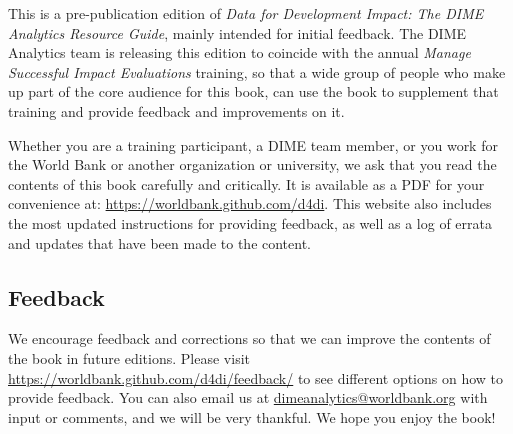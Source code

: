 This is a pre-publication edition of
\textit{Data for Development Impact:
The DIME Analytics Resource Guide}, mainly intended for initial feedback.
The DIME Analytics team is releasing this edition
to coincide with the annual \textit{Manage Successful Impact Evaluations} training,
so that a wide group of people who make up
part of the core audience for this book,
can use the book to supplement that training
and provide feedback and improvements on it.

Whether you are a training participant,
a DIME team member, or you work for the World Bank
or another organization or university,
we ask that you read the contents of this book carefully and critically.
It is available as a PDF for your convenience at:
\url{https://worldbank.github.com/d4di}.
This website also includes the most updated instructions
for providing feedback, as well as
a log of errata and updates that have been made to the content.

\subsection{Feedback}

We encourage feedback and corrections
so that we can improve the contents of the book
in future editions. Please visit 
\url{https://worldbank.github.com/d4di/feedback/} to 
see different options on how to provide feedback.
You can also email us at \url{dimeanalytics@worldbank.org}
with input or comments, and we will be very thankful.
We hope you enjoy the book!
